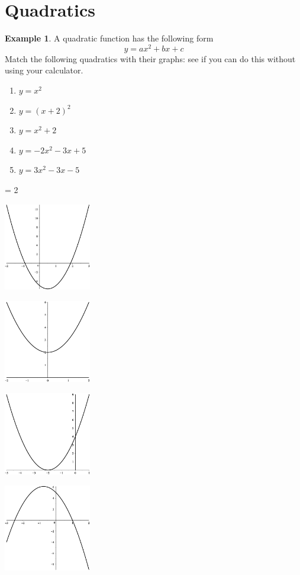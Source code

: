 \documentclass[oneside]{book}
\theoremstyle{definition}
\newtheorem{example}{Example}
\newenvironment{beforesolutions}{\comment}{\endcomment}
\newcommand{\handoutpagebreak}{}
\theoremstyle{solution}
\newenvironment{beforesolutions}{}{}
\newcommand{\handoutpagebreak}{\newpage}
\begin{document}
\handoutpagebreak
\section{Quadratics}

\begin{example}
A quadratic function has the following form
$$
y = ax^2+bx+c
$$
Match the following quadratics with their graphs: see if you can do
this without using your calculator.  
\begin{enumerate}
\item $y=x^2$
\item $y=(x+2)^2$
\item $y=x^2+2$
\item $y=-2x^2-3x+5$
\item $y=3x^2-3x-5$
\end{enumerate}
\bigskip

\begin{beforesolutions}
\begin{multicols}{2}
\parskip = 2\bigskipamount

{\includegraphics[width=1.5in]{graph_of_general_up_parab}}

{\includegraphics[width=1.5in]{graph_of_x_squared_plus_2}}

{\includegraphics[width=1.5in]{graph_of_x_plus_2_squared}}

{\includegraphics[width=1.5in]{graph_of_general_down_parab}}


\end{multicols}
\end{beforesolutions}
\end{example}
\end{document}
